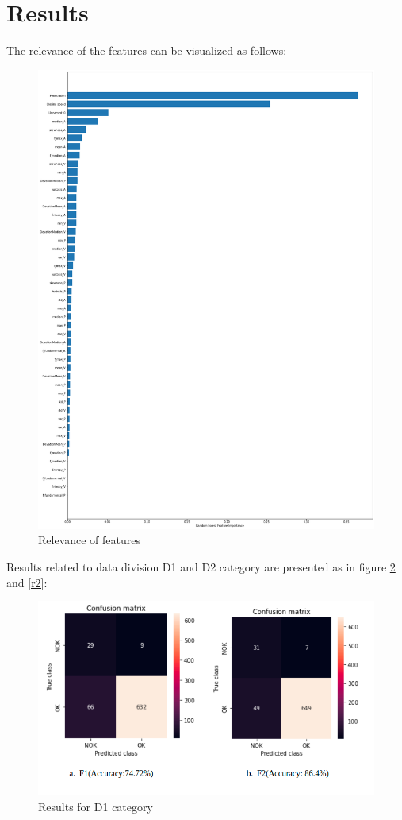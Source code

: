  \section{Results} 
 
 The relevance of the features can be visualized as follows:
   \begin{figure}[h]
   	\centering
   	\includegraphics[width=0.62\linewidth]{images/relvance.png}
   	\caption{Relevance of features}
   	\label{n5}
   \end{figure}
Results related to data division D1 and D2 category are presented as in figure \ref{r1} and \ref{r2}:  
      \begin{figure}[b]
      	\centering
      	\includegraphics[width=1\linewidth]{images/r1.png}
      	\caption{Results for D1 category}
      	\label{r1}
      
      \end{figure}
